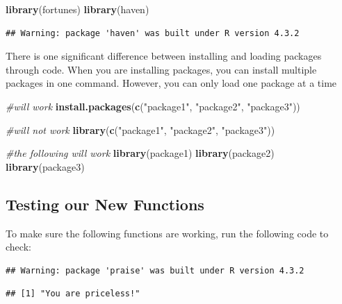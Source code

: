 \documentclass[
]{book}
\newenvironment{Shaded}{\begin{snugshade}}{\end{snugshade}}
\newcommand{\CommentTok}[1]{\textcolor[rgb]{0.56,0.35,0.01}{\textit{#1}}}
\newcommand{\FunctionTok}[1]{\textcolor[rgb]{0.13,0.29,0.53}{\textbf{#1}}}
\newcommand{\NormalTok}[1]{#1}
\newcommand{\StringTok}[1]{\textcolor[rgb]{0.31,0.60,0.02}{#1}}
\begin{document}
\begin{Shaded}
\begin{Highlighting}[]
\FunctionTok{library}\NormalTok{(fortunes)}
\FunctionTok{library}\NormalTok{(haven)}
\end{Highlighting}
\end{Shaded}

\begin{verbatim}
## Warning: package 'haven' was built under R version 4.3.2
\end{verbatim}

There is one significant difference between installing and loading packages through code. When you are installing packages, you can install multiple packages in one command. However, you can only load one package at a time

\begin{Shaded}
\begin{Highlighting}[]
\CommentTok{\#will work}
\FunctionTok{install.packages}\NormalTok{(}\FunctionTok{c}\NormalTok{(}\StringTok{"package1"}\NormalTok{, }\StringTok{"package2"}\NormalTok{, }\StringTok{"package3"}\NormalTok{)) }


\CommentTok{\#will not work}
\FunctionTok{library}\NormalTok{(}\FunctionTok{c}\NormalTok{(}\StringTok{"package1"}\NormalTok{, }\StringTok{"package2"}\NormalTok{, }\StringTok{"package3"}\NormalTok{)) }

\CommentTok{\#the following will work}
\FunctionTok{library}\NormalTok{(package1)}
\FunctionTok{library}\NormalTok{(package2)}
\FunctionTok{library}\NormalTok{(package3)}
\end{Highlighting}
\end{Shaded}

\hypertarget{testing-our-new-functions}{%
\subsection{Testing our New Functions}\label{testing-our-new-functions}}

To make sure the following functions are working, run the following code to check:

\begin{verbatim}
## Warning: package 'praise' was built under R version 4.3.2
\end{verbatim}

\begin{verbatim}
## [1] "You are priceless!"
\end{verbatim}
\end{document}
